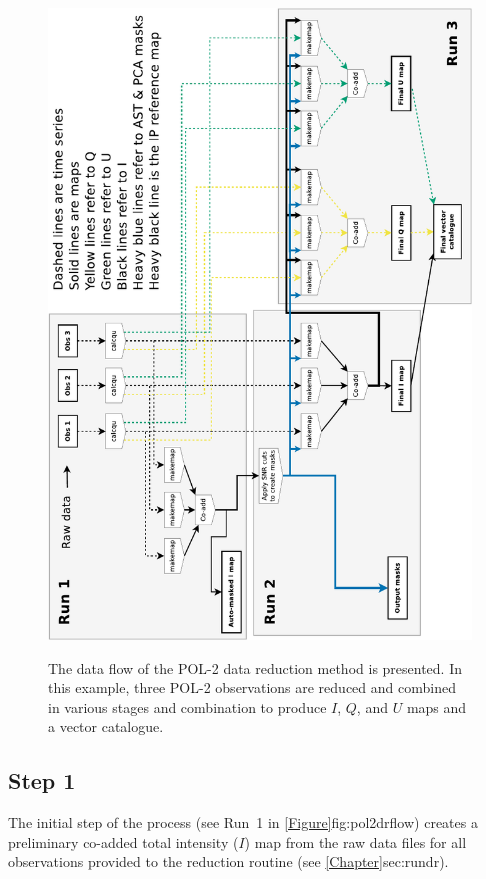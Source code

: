 \begin{figure}[t!]
\begin{center}
{\includegraphics[width=1.0\linewidth]{pol2map_flow}}
\caption [POL-2 Data Flow]{ The data flow of the POL-2 data reduction
  method is presented. In this example, three POL-2 observations are
  reduced and combined in various stages and combination to produce $I$,
  $Q$, and $U$ maps and a vector catalogue.  }
\label{fig:pol2drflow}
\end{center}
\end{figure}


\subsection*{Step 1}

The initial step of the process (see Run~1 in \cref{Figure}{fig:pol2drflow}{})
creates a preliminary co-added total intensity
($I$) map from the raw data files for all observations provided to the
reduction routine (see \cref{Chapter}{sec:rundr}{}).


